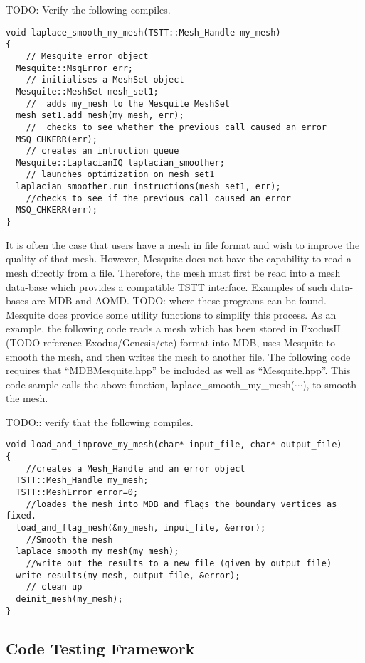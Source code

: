 \documentclass[psfig]{article}
\begin{document}
TODO: Verify the following compiles.

\begin{verbatim}
void laplace_smooth_my_mesh(TSTT::Mesh_Handle my_mesh)
{     
    // Mesquite error object
  Mesquite::MsqError err;
    // initialises a MeshSet object
  Mesquite::MeshSet mesh_set1;
    //  adds my_mesh to the Mesquite MeshSet
  mesh_set1.add_mesh(my_mesh, err);
    //  checks to see whether the previous call caused an error
  MSQ_CHKERR(err);
    // creates an intruction queue
  Mesquite::LaplacianIQ laplacian_smoother;
    // launches optimization on mesh_set1
  laplacian_smoother.run_instructions(mesh_set1, err);
    //checks to see if the previous call caused an error
  MSQ_CHKERR(err);
}
\end{verbatim}

It is often the case that users have a mesh in file format and wish
to improve the quality of that mesh.  However, Mesquite does not have
the capability to read a mesh directly from a file.  Therefore, the mesh
must first be read into a mesh data-base which provides a compatible TSTT
interface.  Examples of such data-bases are MDB and AOMD.  TODO:
where these programs can be found.  Mesquite does provide some utility
functions to simplify this process.  As an example, the following
code reads a mesh which has been stored in ExodusII (TODO reference
Exodus/Genesis/etc) format into MDB, uses Mesquite to smooth the mesh,
and then writes the mesh to another file.  The following code requires
that ``MDBMesquite.hpp'' be included as well as ``Mesquite.hpp''.  This
code sample calls the above function, laplace\_smooth\_my\_mesh($\cdots$),
to smooth the mesh.

TODO:: verify that the following compiles.

\begin{verbatim}
void load_and_improve_my_mesh(char* input_file, char* output_file)
{
    //creates a Mesh_Handle and an error object
  TSTT::Mesh_Handle my_mesh;
  TSTT::MeshError error=0;
    //loades the mesh into MDB and flags the boundary vertices as fixed.
  load_and_flag_mesh(&my_mesh, input_file, &error);  
    //Smooth the mesh
  laplace_smooth_my_mesh(my_mesh);
    //write out the results to a new file (given by output_file)
  write_results(my_mesh, output_file, &error);
    // clean up
  deinit_mesh(my_mesh);
}
\end{verbatim}

\subsection{Code Testing Framework}
\end{document}

